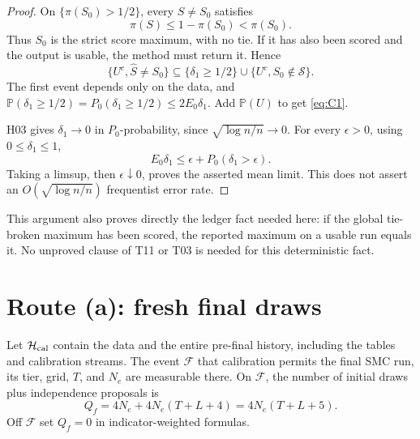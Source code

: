 ﻿\documentclass[11pt]{article}
\newcommand{\Pp}{\mathbb P}
\newcommand{\1}{\mathbf 1}
\newcommand{\Sc}{\mathcal S}
\newcommand{\Fc}{\mathcal F}
\begin{document}
\begin{proof}
On \(\{\pi(S_0)>1/2\}\), every \(S\ne S_0\) satisfies
\[
 \pi(S)\le1-\pi(S_0)<\pi(S_0).
\]
Thus \(S_0\) is the strict score maximum, with no tie. If it has also been
scored and the output is usable, the method must return it. Hence
\[
 \{U^c,\widehat S\ne S_0\}
 \subseteq\{\delta_1\ge1/2\}\cup\{U^c,S_0\notin\Sc\}.
\]
The first event depends only on the data, and
\(\Pp(\delta_1\ge1/2)=P_0(\delta_1\ge1/2)\le2E_0\delta_1\).
Add \(\Pp(U)\) to get \eqref{eq:C1}.

H03 gives \(\delta_1\to0\) in \(P_0\)-probability, since
\(\sqrt{\log n/n}\to0\). For every \(\epsilon>0\), using
\(0\le\delta_1\le1\),
\[
 E_0\delta_1\le\epsilon+P_0(\delta_1>\epsilon).
\]
Taking a limsup, then \(\epsilon\downarrow0\), proves the asserted mean limit.
This does not assert an \(O(\sqrt{\log n/n})\) frequentist error rate.
\end{proof}

This argument also proves directly the ledger fact needed here: if the global
tie-broken maximum has been scored, the reported maximum on a usable run equals
it. No unproved clause of T11 or T03 is needed for this deterministic fact.

\section{Route (a): fresh final draws}
Let \(\mathcal H_{\rm cal}\) contain the data and the entire pre-final
history, including the tables and calibration streams. The event \(\Fc\)
that calibration permits the final SMC run, its tier, grid, \(T\), and
\(N_e\) are measurable there. On \(\Fc\), the number of initial draws
plus independence proposals is
\begin{equation}\label{eq:Q}
 Q_f=4N_e+4N_e(T+L+4)=4N_e(T+L+5).
\end{equation}
Off \(\Fc\) set \(Q_f=0\) in indicator-weighted formulas.
\end{document}
